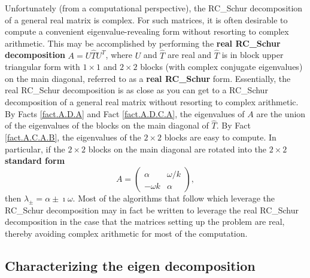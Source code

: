 Unfortunately (from a computational perspective), the RC_Schur decomposition of a general real matrix is complex.
For such matrices, it is often desirable to compute a convenient eigenvalue-revealing form without resorting to
complex arithmetic.  This may be accomplished by performing the {\bf real RC_Schur decomposition} $A=U \hat T U^T$, 
where $U$ and $\hat T$ are real and $\hat T$ is in block upper triangular form with $1\times 1$ and $2\times 2$
blocks (with complex conjugate eigenvalues) on the main diagonal, referred to as a {\bf real RC_Schur} form.  
Essentially, the real RC_Schur decomposition is as close as you can get to a RC_Schur decomposition of a
general real matrix without resorting to complex arithmetic.
By Facts \ref{fact.A.D.A} and Fact \ref{fact.A.D.C.A}, the eigenvalues of $A$ are the
union of the eigenvalues of the blocks on the main diagonal of $\hat T$.  By Fact \ref{fact.A.C.A.B}, the eigenvalues of
the $2\times 2$ blocks are easy to compute.
In particular, if the $2\times 2$ blocks on the main diagonal are rotated into the {\bf $2\times 2$ standard form}
\begin{equation}
A=\begin{pmatrix} \alpha & \omega/k \\ -\omega k & \alpha \end{pmatrix},
\label{2by2standardform}
\end{equation}
then $\lambda_{\pm}=\alpha\pm \imath \omega$.  Most of the algorithms that follow which leverage the RC_Schur decomposition may
in fact be written to leverage the real RC_Schur decomposition in the case that the matrices setting up the problem are real, thereby
avoiding complex arithmetic for most of the computation.

\subsection{Characterizing the eigen decomposition}\label{sec.A.D.D}

